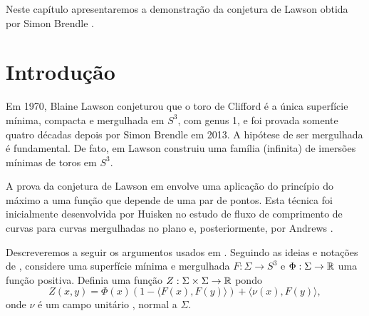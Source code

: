 


Neste capítulo apresentaremos a demonstração da conjetura de Lawson obtida por Simon Brendle \cite{Brendle2013a}.

\section{Introdução}

Em 1970, Blaine Lawson \cite{Lawson1970a} conjeturou que o toro de Clifford é a única superfície mínima, compacta e mergulhada em $S^3$, com genus 1, e foi provada somente quatro décadas depois por Simon Brendle \cite{Brendle2013a} em 2013. A hipótese de ser mergulhada é fundamental. De fato, em \cite{Lawson1970} Lawson construiu uma família (infinita) de imersões mínimas de toros em $S^3$.

A prova da conjetura de Lawson em \cite{Brendle2013a} envolve uma aplicação do princípio do máximo a uma função que depende de uma par de pontos. Esta técnica foi inicialmente desenvolvida por Huisken \cite{Huisken1998} no estudo de fluxo de comprimento de curvas para curvas mergulhadas no plano e, posteriormente, por Andrews \cite{Andrews2012}.

Descreveremos a seguir os argumentos usados em \cite{Brendle2013a}. Seguindo as ideias e notações de \cite{Andrews2012}, considere uma superfície mínima e mergulhada $ F: \Sigma \rightarrow S^3 $ e $ \Phi: \Sigma \rightarrow \mathbb{R} $  uma função positiva. Definia uma função $ Z: \Sigma \times \Sigma \rightarrow \mathbb{R} $ pondo
\begin{equation}\label{def_de_Z}
	Z(x,y) = \Phi(x) (1 - \langle F(x),F(y) \rangle ) + \langle \nu(x), F(y) \rangle,
\end{equation}
onde $ \nu $ é um campo unitário , normal a $ \Sigma $.

